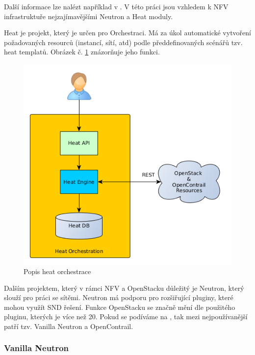 Další informace lze nalézt například v \cite{OpenStack}. V této práci jsou vzhledem k NFV infrastruktuře nejzajímavějšími Neutron a Heat moduly.

Heat je projekt, který je určen pro Orchestraci. Má za úkol automatické vytvoření požadovaných resourců (instancí, sítí, atd) podle předdefinovaných scénářů tzv. heat templatů. Obrázek č. \ref{fig:heat_engine} znázorňuje jeho funkci. \cite{HEAT}

\begin{figure}[h]
\begin{centering}
\includegraphics[scale=0.5]{images/heat_engine}
\par\end{centering}
\caption{Popis heat orchestrace\label{fig:heat_engine}}
\end{figure}

Dalším projektem, který v rámci NFV a OpenStacku důležitý je Neutron, který slouží pro práci se sítěmi. Neutron má podporu pro rozšiřující pluginy, které mohou využít SND řešení. Funkce OpenStacku se značně mění dle použitého pluginu, kterých je více než 20. Pokud se podíváme na \cite{neutron_survey} , tak mezi nejpoužívanější patří tzv. Vanilla Neutron a OpenContrail. 

\subsubsection{Vanilla Neutron}

